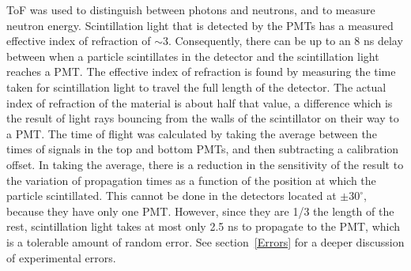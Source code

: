 ToF was used to distinguish between photons and neutrons, and to measure neutron energy.
Scintillation light that is detected by the PMTs has a measured effective index of refraction of $\sim$3.
Consequently, there can be up to an 8 ns delay between when a particle scintillates in the detector and the scintillation light reaches a PMT.
The effective index of refraction is found by measuring the time taken for scintillation light to travel the full length of the detector.
The actual index of refraction of the material is about half that value, a difference which is the result of light rays bouncing from the walls of the scintillator on their way to a PMT.
The time of flight was calculated by taking the average between the times of signals in the top and bottom PMTs, and then subtracting a calibration offset.
In taking the average, there is a reduction in the sensitivity of the result to the variation of propagation times as a function of the position at which the particle scintillated.
This cannot be done in the detectors located at $\pm30^{\circ}$, because they have only one PMT.
However, since they are 1/3 the length of the rest, scintillation light takes at most only 2.5 ns to propagate to the PMT, which is a tolerable amount of random error.
See section~\ref{Errors} for a deeper discussion of experimental errors.

